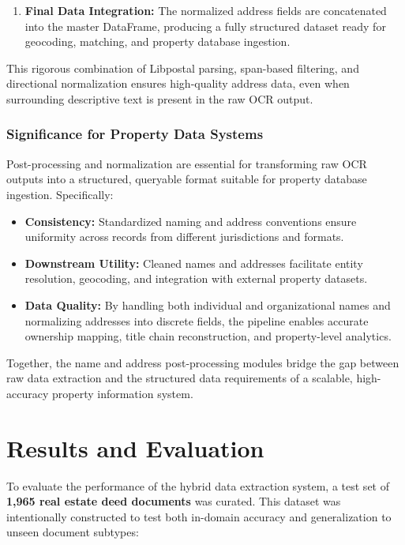\documentclass{article}
\begin{document}
\begin{enumerate}
    \item \textbf{Final Data Integration:}  
    The normalized address fields are concatenated into the master DataFrame, producing a fully structured dataset ready for geocoding, matching, and property database ingestion.
\end{enumerate}

This rigorous combination of Libpostal parsing, span-based filtering, and directional normalization ensures high-quality address data, even when surrounding descriptive text is present in the raw OCR output.


\subsubsection{Significance for Property Data Systems}

Post-processing and normalization are essential for transforming raw OCR outputs into a structured, queryable format suitable for property database ingestion. \cite{oracle_address_cleansing} Specifically:
\begin{itemize}
    \item \textbf{Consistency:} Standardized naming and address conventions ensure uniformity across records from different jurisdictions and formats.
    \item \textbf{Downstream Utility:} Cleaned names and addresses facilitate entity resolution, geocoding, and integration with external property datasets.
    \item \textbf{Data Quality:} By handling both individual and organizational names and normalizing addresses into discrete fields, the pipeline enables accurate ownership mapping, title chain reconstruction, and property-level analytics.
\end{itemize}

Together, the name and address post-processing modules bridge the gap between raw data extraction and the structured data requirements of a scalable, high-accuracy property information system.

\section{Results and Evaluation}

To evaluate the performance of the hybrid data extraction system, a test set of \textbf{1,965 real estate deed documents} was curated. This dataset was intentionally constructed to test both in-domain accuracy and generalization to unseen document subtypes:
\end{document}

